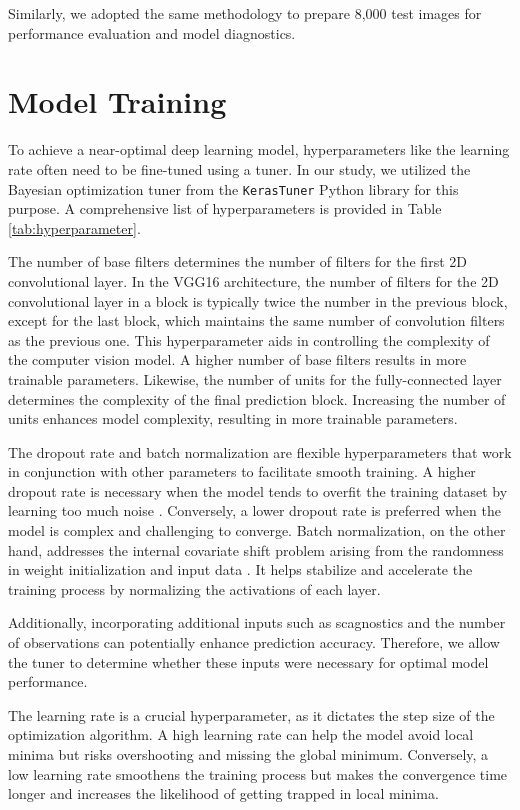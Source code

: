 \documentclass[]{interact}
\theoremstyle{plain}%
\theoremstyle{definition}
\theoremstyle{remark}
\begin{document}
Similarly, we adopted the same methodology to prepare 8,000 test images
for performance evaluation and model diagnostics.

\section{Model Training}\label{sec-model-training}

To achieve a near-optimal deep learning model, hyperparameters like the
learning rate often need to be fine-tuned using a tuner. In our study,
we utilized the Bayesian optimization tuner from the \texttt{KerasTuner}
Python library \citep{omalley2019kerastuner} for this purpose. A
comprehensive list of hyperparameters is provided in Table
\ref{tab:hyperparameter}.

The number of base filters determines the number of filters for the
first 2D convolutional layer. In the VGG16 architecture, the number of
filters for the 2D convolutional layer in a block is typically twice the
number in the previous block, except for the last block, which maintains
the same number of convolution filters as the previous one. This
hyperparameter aids in controlling the complexity of the computer vision
model. A higher number of base filters results in more trainable
parameters. Likewise, the number of units for the fully-connected layer
determines the complexity of the final prediction block. Increasing the
number of units enhances model complexity, resulting in more trainable
parameters.

The dropout rate and batch normalization are flexible hyperparameters
that work in conjunction with other parameters to facilitate smooth
training. A higher dropout rate is necessary when the model tends to
overfit the training dataset by learning too much noise
\citep{srivastava2014dropout}. Conversely, a lower dropout rate is
preferred when the model is complex and challenging to converge. Batch
normalization, on the other hand, addresses the internal covariate shift
problem arising from the randomness in weight initialization and input
data \citep{goodfellow2016deep}. It helps stabilize and accelerate the
training process by normalizing the activations of each layer.

Additionally, incorporating additional inputs such as scagnostics and
the number of observations can potentially enhance prediction accuracy.
Therefore, we allow the tuner to determine whether these inputs were
necessary for optimal model performance.

The learning rate is a crucial hyperparameter, as it dictates the step
size of the optimization algorithm. A high learning rate can help the
model avoid local minima but risks overshooting and missing the global
minimum. Conversely, a low learning rate smoothens the training process
but makes the convergence time longer and increases the likelihood of
getting trapped in local minima.
\end{document}
